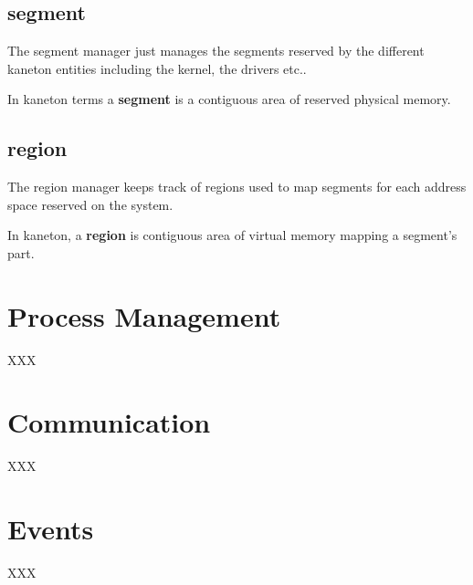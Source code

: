 %
%

\subsection{segment}

The segment manager just manages the segments reserved by
the different kaneton entities including the kernel, the drivers etc..

In kaneton terms a \textbf{segment} is a contiguous area of reserved
physical memory.

%
%

\subsection{region}

The region manager keeps track of regions used to map segments for
each address space reserved on the system.

In kaneton, a \textbf{region} is contiguous area of virtual memory
mapping a segment's part.

%
%

\section{Process Management}

XXX

%
%

\section{Communication}

XXX

%
%

\section{Events}

XXX
